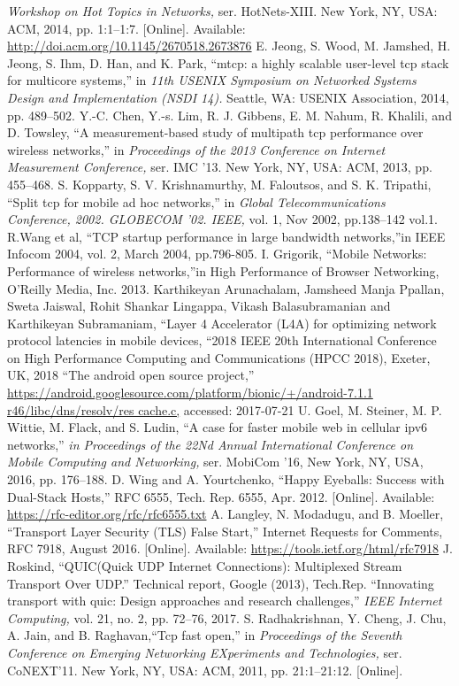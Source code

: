 \begin{multicols}{2}
\begin{thebibliography}{99}
\textit{Workshop on Hot Topics in Networks,} ser. HotNets-XIII. New York, NY, USA: ACM, 2014, pp. 1:1–1:7. [Online]. Available: \url{http://doi.acm.org/10.1145/2670518.2673876}
 E. Jeong, S. Wood, M. Jamshed, H. Jeong, S. Ihm, D. Han, and K. Park, “mtcp: a highly scalable user-level tcp stack for multicore systems,” in \textit{11th USENIX Symposium on Networked Systems Design and Implementation (NSDI 14).} Seattle, WA: USENIX Association, 2014, pp. 489–502.
 Y.-C. Chen, Y.-s. Lim, R. J. Gibbens, E. M. Nahum, R. Khalili, and D. Towsley, “A measurement-based study of multipath tcp performance over wireless networks,” in \textit{Proceedings of the 2013 Conference on Internet Measurement Conference,} ser. IMC ’13. New York, NY, USA: ACM, 2013, pp. 455–468.
 S. Kopparty, S. V. Krishnamurthy, M. Faloutsos, and S. K. Tripathi, “Split tcp for mobile ad hoc networks,” in \textit{Global Telecommunications Conference, 2002. GLOBECOM ’02. IEEE,} vol. 1, Nov 2002, pp.138–142 vol.1.
 R.Wang et al, “TCP startup performance in large bandwidth networks,”in IEEE Infocom 2004, vol. 2, March 2004, pp.796-805.
 I. Grigorik, “Mobile Networks: Performance of wireless networks,”in High Performance of Browser Networking, O’Reilly Media, Inc. 2013.
 Karthikeyan Arunachalam, Jamsheed Manja Ppallan, Sweta Jaiswal, Rohit Shankar Lingappa, Vikash Balasubramanian and Karthikeyan Subramaniam, “Layer 4 Accelerator (L4A) for optimizing network protocol latencies in mobile devices, “2018 IEEE 20th International Conference on High Performance Computing and Communications (HPCC 2018), Exeter, UK, 2018
 “The android open source project,” \url{https://android.googlesource.com/platform/bionic/+/android-7.1.1 r46/libc/dns/resolv/res cache.c,} accessed: 2017-07-21
 U. Goel, M. Steiner, M. P. Wittie, M. Flack, and S. Ludin, “A case for faster mobile web in cellular ipv6 networks,” \textit{in Proceedings of the 22Nd Annual International Conference on Mobile Computing and Networking,} ser. MobiCom ’16, New York, NY, USA, 2016, pp. 176–188.
 D. Wing and A. Yourtchenko, “Happy Eyeballs: Success with Dual-Stack Hosts,” RFC 6555, Tech. Rep. 6555, Apr. 2012. [Online]. Available: \url{https://rfc-editor.org/rfc/rfc6555.txt}
 A. Langley, N. Modadugu, and B. Moeller, “Transport Layer Security (TLS) False Start,” Internet Requests for Comments, RFC 7918, August 2016. [Online]. Available: \url{https://tools.ietf.org/html/rfc7918}
 J. Roskind, “QUIC(Quick UDP Internet Connections): Multiplexed Stream Transport Over UDP.” Technical report, Google (2013), Tech.Rep.
 “Innovating transport with quic: Design approaches and research challenges,” \textit{IEEE Internet Computing,} vol. 21, no. 2, pp. 72–76, 2017.
 S. Radhakrishnan, Y. Cheng, J. Chu, A. Jain, and B. Raghavan,“Tcp fast open,” in \textit{Proceedings of the Seventh Conference on Emerging Networking EXperiments and Technologies,} ser. CoNEXT’11. New York, NY, USA: ACM, 2011, pp. 21:1–21:12. [Online].


\end{thebibliography}
\end{multicols}
